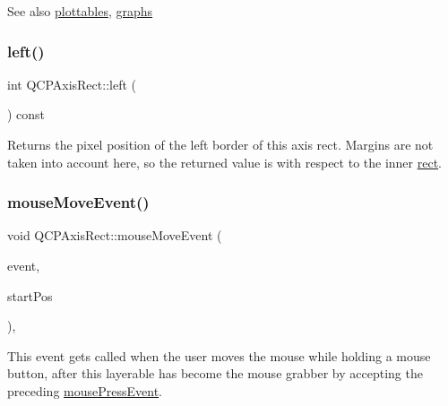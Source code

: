 \begin{DoxySeeAlso}{See also}
\mbox{\hyperlink{class_q_c_p_axis_rect_a587d073a97b27bc7293fab4b2774ad59}{plottables}}, \mbox{\hyperlink{class_q_c_p_axis_rect_a2d9ded3eca97be1fcb5867949391bb88}{graphs}} 
\end{DoxySeeAlso}
\mbox{\label{class_q_c_p_axis_rect_afb4a3de02046b20b9310bdb8fca781c3}} 
\subsubsection{\texorpdfstring{left()}{left()}}
{\footnotesize\ttfamily int Q\+C\+P\+Axis\+Rect\+::left (\begin{DoxyParamCaption}{ }\end{DoxyParamCaption}) const\hspace{0.3cm}{\ttfamily [inline]}}

Returns the pixel position of the left border of this axis rect. Margins are not taken into account here, so the returned value is with respect to the inner \mbox{\hyperlink{class_q_c_p_layout_element_a208effccfe2cca4a0eaf9393e60f2dd4}{rect}}. \mbox{\label{class_q_c_p_axis_rect_a9cd27ad8c5cfb49aefd9dbb30def4beb}} 
\subsubsection{\texorpdfstring{mouse\+Move\+Event()}{mouseMoveEvent()}}
{\footnotesize\ttfamily void Q\+C\+P\+Axis\+Rect\+::mouse\+Move\+Event (\begin{DoxyParamCaption}\item[{Q\+Mouse\+Event $\ast$}]{event,  }\item[{const Q\+PointF \&}]{start\+Pos }\end{DoxyParamCaption})\hspace{0.3cm}{\ttfamily [protected]}, {\ttfamily [virtual]}}

This event gets called when the user moves the mouse while holding a mouse button, after this layerable has become the mouse grabber by accepting the preceding \mbox{\hyperlink{class_q_c_p_axis_rect_aa9a7c807eaa4666870ac94aa6abc4dde}{mouse\+Press\+Event}}.

